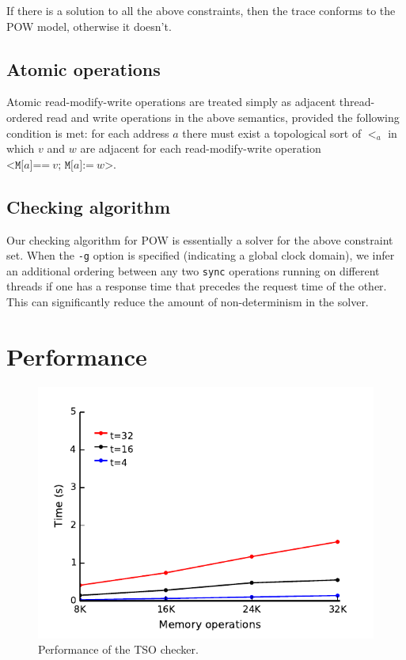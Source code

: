 \documentclass[11pt]{article}
\begin{document}
\noindent If there is a solution to all the above constraints, then
the trace conforms to the POW model, otherwise it doesn't.

\subsection*{Atomic operations}

Atomic read-modify-write operations are treated simply as adjacent
thread-ordered read and write operations in the above semantics,
provided the following condition is met: for each address $a$ there
must exist a topological sort of $<_a$ in which $v$ and $w$ are
adjacent for each read-modify-write operation
$\texttt{<M[}a\texttt{]==}~v\texttt{; M[}a\texttt{]:=}~w\texttt{>}$.

\subsection{Checking algorithm}

Our checking algorithm for POW is essentially a solver for the above
constraint set.  When the \verb!-g! option is specified (indicating a
global clock domain), we infer an additional ordering between any two
\texttt{sync} operations running on different threads if one has a
response time that precedes the request time of the other.  This can
significantly reduce the amount of non-determinism in the solver.

\section{Performance}
\label{Section:Performance}

\begin{figure}
\begin{center}
\includegraphics{performance/tso.pdf}
\end{center}
\caption{Performance of the TSO checker.}
\label{Graph:TSO}
\end{figure}
\end{document}
